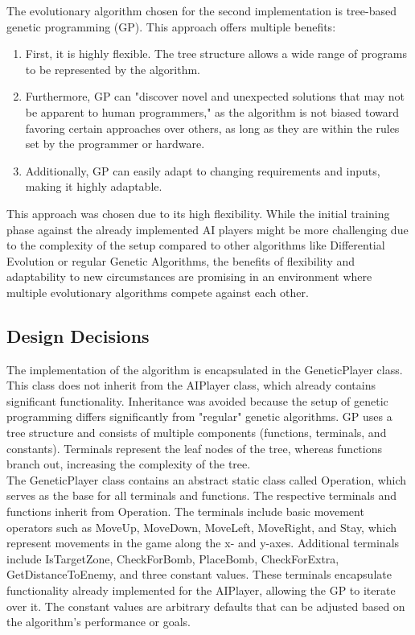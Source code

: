\documentclass[sigconf]{acmart} %
\begin{document}
The evolutionary algorithm chosen for the second implementation is tree-based genetic programming (GP). This approach offers multiple benefits: 

\begin{enumerate}
	\item First, it is highly flexible. The tree structure allows a wide range of programs to be represented by the algorithm. 
 	\item Furthermore, GP can "discover novel and unexpected solutions that may not be apparent to human programmers," as the algorithm is not biased toward favoring certain approaches over others, as long as they are within the rules set by the programmer or hardware.
  	\item Additionally, GP can easily adapt to changing requirements and inputs, making it highly adaptable.
\end{enumerate}
This approach was chosen due to its high flexibility. While the initial training phase against the already implemented AI players might be more challenging due to the complexity of the setup compared to other algorithms like Differential Evolution or regular Genetic Algorithms, the benefits of flexibility and adaptability to new circumstances are promising in an environment where multiple evolutionary algorithms compete against each other. 

\subsection{Design Decisions}

The implementation of the algorithm is encapsulated in the GeneticPlayer class. This class does not inherit from the AIPlayer class, which already contains significant functionality. Inheritance was avoided because the setup of genetic programming differs significantly from "regular" genetic algorithms. GP uses a tree structure and consists of multiple components (functions, terminals, and constants). Terminals represent the leaf nodes of the tree, whereas functions branch out, increasing the complexity of the tree. \\ 
The GeneticPlayer class contains an abstract static class called Operation, which serves as the base for all terminals and functions. The respective terminals and functions inherit from Operation. The terminals include basic movement operators such as MoveUp, MoveDown, MoveLeft, MoveRight, and Stay, which represent movements in the game along the x- and y-axes. Additional terminals include IsTargetZone, CheckForBomb, PlaceBomb, CheckForExtra, GetDistanceToEnemy, and three constant values. These terminals encapsulate functionality already implemented for the AIPlayer, allowing the GP to iterate over it. The constant values are arbitrary defaults that can be adjusted based on the algorithm's performance or goals.
\end{document}
